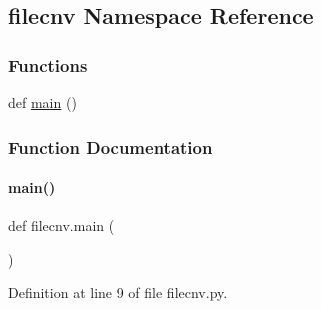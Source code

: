 \hypertarget{namespacefilecnv}{}\subsection{filecnv Namespace Reference}
\label{namespacefilecnv}
\subsubsection*{Functions}
\begin{DoxyCompactItemize}
\item 
def \hyperlink{namespacefilecnv_a06dfafe5f7ce6c1804b534ed740dfac0}{main} ()
\end{DoxyCompactItemize}


\subsubsection{Function Documentation}
\mbox{\label{namespacefilecnv_a06dfafe5f7ce6c1804b534ed740dfac0}} 
\paragraph{\texorpdfstring{main()}{main()}}
{\footnotesize\ttfamily def filecnv.\+main (\begin{DoxyParamCaption}{ }\end{DoxyParamCaption})}



Definition at line 9 of file filecnv.\+py.

